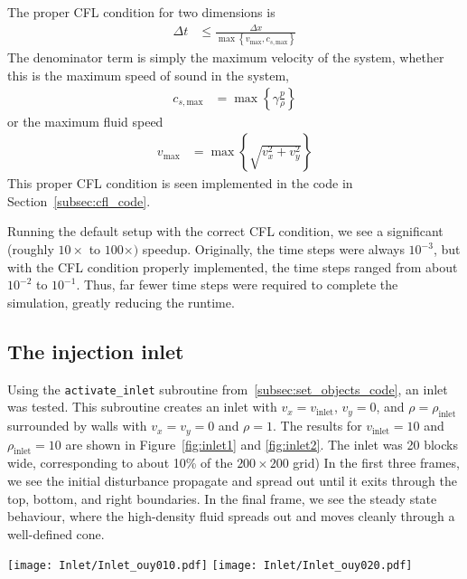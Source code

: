 \documentclass[twocolumn]{myarticle}
\numberwithin{equation}{section}
\begin{document}
The proper CFL condition for two dimensions is
\begin{align}
    \Delta t &\leq \frac{\Delta x}{\max \left\{ v_\text{max}, c_{s,\text{max}} \right\}}
\end{align}
The denominator term is simply the maximum velocity of the system, whether this is the maximum speed of sound in the system, 
\begin{align}
    c_{s, \text{max}} &= \max \left\{ \gamma \frac{p}{\rho} \right\}
\end{align}
or the maximum fluid speed 
\begin{align}
    v_\text{max} &= \max \left\{ \sqrt{v_x^2 + v_y^2} \right\}
\end{align}
This proper CFL condition is seen implemented in the code in Section~\ref{subsec:cfl_code}.

Running the default setup with the correct CFL condition, we see a significant (roughly $ 10 \times $ to $ 100 \times) $ speedup.
Originally, the time steps were always $ 10^{-3} $, but with the CFL condition properly implemented, the time steps ranged from about $ 10^{-2} $ to $ 10^{-1} $.
Thus, far fewer time steps were required to complete the simulation, greatly reducing the runtime.

\subsection{The injection inlet}
\label{subsec:the_injection_inlet}

Using the \texttt{activate\_inlet} subroutine from~\ref{subsec:set_objects_code}, an inlet was tested.
This subroutine creates an inlet with $ v_x = v_\text{inlet} $, $ v_y = 0 $, and $ \rho = \rho_\text{inlet} $ surrounded by walls with $ v_x = v_y = 0 $ and $ \rho = 1 $.
The results for $ v_\text{inlet} = 10 $ and $ \rho_\text{inlet} = 10 $ are shown in Figure~\ref{fig:inlet1} and \ref{fig:inlet2}.
The inlet was 20 blocks wide, corresponding to about 10\% of the $ 200 \times 200 $ grid)
In the first three frames, we see the initial disturbance propagate and spread out until it exits through the top, bottom, and right boundaries.
In the final frame, we see the steady state behaviour, where the high-density fluid spreads out and moves cleanly through a well-defined cone.

\begin{figure*}[ht]
    \centering
    \texttt{[image: Inlet/Inlet\_ouy010.pdf]}
    \texttt{[image: Inlet/Inlet\_ouy020.pdf]}
    \caption{Inlet simulation with $ v_\text{inlet} = 10 $ and $ \rho_\text{inlet} = 10 $.}
    \label{fig:inlet1}
\end{figure*}
\end{document}
